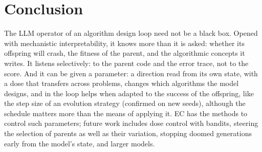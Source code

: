 \section{Conclusion}\label{sec:conclusion}

The LLM operator of an algorithm design loop need not be a black box.
Opened with mechanistic interpretability, it knows more than it is
asked: whether its offspring will crash, the fitness of the parent, and
the algorithmic concepts it writes. It listens selectively: to the
parent code and the error trace, not to the score. And it can be given
a parameter: a direction read from its own state, with a dose that
transfers across problems, changes which algorithms the model designs,
and in the loop helps when adapted to the success of the offspring,
like the step size of an evolution strategy (confirmed on new seeds),
although the schedule matters more than the means of applying it. EC has the
methods to control such parameters; future work includes dose control
with bandits, steering the selection of parents as well as their
variation, stopping doomed generations early from the model's state,
and larger models.
